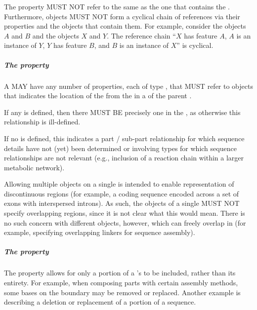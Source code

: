 The  property MUST NOT refer to the same  as the one that contains the .
Furthermore,  objects MUST NOT form a cyclical chain of references via their  properties and the  objects that contain them.
For example, consider the  objects $A$ and $B$ and the  objects $X$ and $Y$. The reference chain ``$X$ has feature $A$, $A$ is an instance of $Y$, $Y$ has feature $B$, and $B$ is an instance of $X$'' is cyclical.


\subparagraph{The  property}\label{sec:hasLocation:SC}

A  MAY have any number of  properties, each of type , that MUST refer to  objects that indicates the location of the  from the   in a  of the parent .

If any  is defined, then there MUST BE precisely one  in the  , as otherwise this relationship is ill-defined.

If no  is defined, this indicates a part / sub-part relationship for which sequence details have not (yet) been determined or involving types for which sequence relationships are not relevant (e.g., inclusion of a reaction chain within a larger metabolic network).

Allowing multiple  objects on a single  is intended to enable representation of discontinuous regions (for example, a coding sequence encoded across a set of exons with interspersed introns).
As such, the  objects of a single  MUST NOT specify overlapping regions, since it is not clear what this would mean.
There is no such concern with different objects, however, which can freely overlap in  (for example, specifying overlapping linkers for sequence assembly).


\subparagraph{The  property}\label{sec:sourceLocation}

The  property allows for only a portion of a 's  to be included, rather than its entirety.
For example, when composing parts with certain assembly methods, some bases on the boundary may be removed or replaced.
Another example is describing a deletion or replacement of a portion of a sequence.

